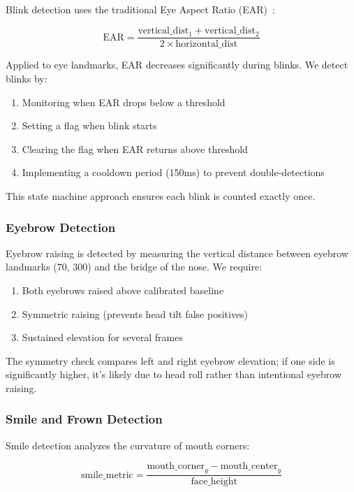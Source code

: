 \documentclass[sigconf]{acmart}
\begin{document}
Blink detection uses the traditional Eye Aspect Ratio (EAR)~\cite{soukupova2016real}:

\begin{equation}
\text{EAR} = \frac{\text{vertical\_dist}_1 + \text{vertical\_dist}_2}{2 \times \text{horizontal\_dist}}
\end{equation}

Applied to eye landmarks, EAR decreases significantly during blinks. We detect blinks by:

\begin{enumerate}
\item Monitoring when EAR drops below a threshold
\item Setting a flag when blink starts
\item Clearing the flag when EAR returns above threshold
\item Implementing a cooldown period (150ms) to prevent double-detections
\end{enumerate}

This state machine approach ensures each blink is counted exactly once.

\subsubsection{Eyebrow Detection}

Eyebrow raising is detected by measuring the vertical distance between eyebrow landmarks (70, 300) and the bridge of the nose. We require:

\begin{enumerate}
\item Both eyebrows raised above calibrated baseline
\item Symmetric raising (prevents head tilt false positives)
\item Sustained elevation for several frames
\end{enumerate}

The symmetry check compares left and right eyebrow elevation; if one side is significantly higher, it's likely due to head roll rather than intentional eyebrow raising.

\subsubsection{Smile and Frown Detection}

Smile detection analyzes the curvature of mouth corners:

\begin{equation}
\text{smile\_metric} = \frac{\text{mouth\_corner}_y - \text{mouth\_center}_y}{\text{face\_height}}
\end{equation}
\end{document}
